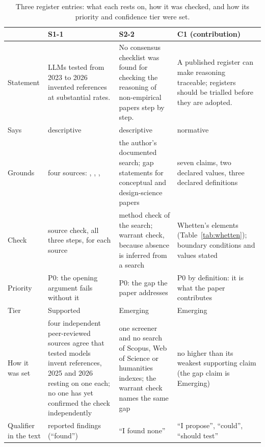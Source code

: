 \documentclass[12pt, a4paper]{article}
\begin{document}
\begin{table}[htbp]
\centering
\caption{Three register entries: what each rests on, how it was checked, and how its priority and confidence tier were set.}
\label{tab:examples}
\footnotesize
\begin{tabular}{@{}p{2.3cm}p{4.1cm}p{4.1cm}p{4.1cm}@{}}
\toprule
 & \textbf{S1-1} & \textbf{S2-2} & \textbf{C1 (contribution)} \\
\midrule
Statement & LLMs tested from 2023 to 2026 invented references at substantial rates. & No consensus checklist was found for checking the reasoning of non-empirical papers step by step. & A published register can make reasoning traceable; registers should be trialled before they are adopted. \\
Says & descriptive & descriptive & normative \\
Grounds & four sources: \citet{mugaanyi2024}, \citet{walters2023}, \citet{linardon2025}, \citet{seifi2026} & the author's documented search; gap statements for conceptual and design-science papers & seven claims, two declared values, three declared definitions \\
Check & source check, all three steps, for each source & method check of the search; warrant check, because absence is inferred from a search & Whetten's elements (Table~\ref{tab:whetten}); boundary conditions and values stated \\
Priority & P0: the opening argument fails without it & P0: the gap the paper addresses & P0 by definition: it is what the paper contributes \\
Tier & Supported & Emerging & Emerging \\
How it was set & four independent peer-reviewed sources agree that tested models invent references, 2025 and 2026 resting on one each; no one has yet confirmed the check independently & one screener and no search of Scopus, Web of Science or humanities indexes; the warrant check names the same gap & no higher than its weakest supporting claim (the gap claim is Emerging) \\
Qualifier in the text & reported findings (``found'') & ``I found none'' & ``I propose'', ``could'', ``should test'' \\
\bottomrule
\end{tabular}
\end{table}
\end{document}
